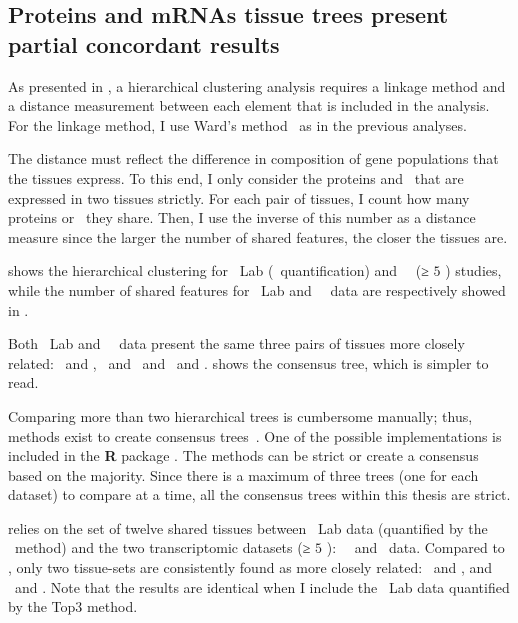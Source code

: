 \subsection{Proteins and mRNAs tissue trees present partial concordant results\\}
\vspace{-12mm}

As presented in ,
a hierarchical clustering analysis requires a linkage method
and a distance measurement between each element that is included in the analysis.
For the linkage method, I use Ward's method~
as in the previous analyses.

The distance must reflect the difference in composition of gene populations
that the tissues express.
To this end,
I only consider the proteins and \mRNAs\
that are expressed in two tissues strictly.
For each pair of tissues,
I count how many proteins or \mRNAs\ they share.
Then, I use the inverse of this number as a distance measure
since the larger the number of shared features,
the closer the tissues are.

 shows the hierarchical clustering for
\pandey\ Lab (\PPKM\ quantification)
and \uhlen\ \etal\ (≥ $5$ \FPKM)  studies,
while the number of shared features for \pandey\ Lab and \uhlen\ \etal\ data
are respectively showed in .

Both \pandey\ Lab and \uhlen\ \etal\ data present
the same three pairs of tissues more closely related:
\Testis\ and \Ovary, \Rectum\ and \hColon\ and \Liver\ and \Kidney.
\Cref{fig:consensus2D15TQ3} shows the consensus tree,
which is simpler to read.\\
\vspace{-\baselineskip}

Comparing more than two hierarchical trees is cumbersome manually;
thus, methods exist to create consensus trees~.
One of the possible implementations is included in
the \textbf{\textsf{R}} package .
The methods can be strict or create a consensus based on the majority.
Since there is a maximum of three trees (one for each dataset)
to compare at a time,
all the consensus trees within this thesis are strict.

 relies on the set of twelve shared tissues between
\pandey\ Lab data (quantified by the \PPKM\ method)
and the two transcriptomic datasets (≥ $5$ \FPKM): \uhlen\ \etal\ and \gtex\ data.
Compared to \Cref{fig:consensus2D15TQ3},
only two tissue-sets are consistently found
as more closely related: \Testis\ and \Ovary, and \Liver\ and \Kidney.
Note that the results are identical
when I include the \pandey\ Lab data quantified by the Top3 method.


